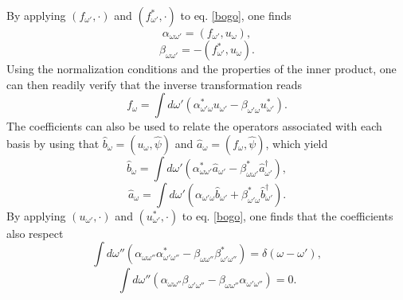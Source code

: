 \documentclass[
12pt,		%
openright,	%
twoside,  %
a4paper,			%
chapter=TITLE,		%
english,			%
french,				%
spanish,			%
brazil				%
]{USPSC-classe/USPSC}
\begin{document}
By applying $(f_{\omega'},\cdot)$ and $(f^*_{\omega'},\cdot)$ to eq. \ref{bogo}, one finds
\begin{equation}\label{coef1}
    \alpha_{\omega\omega'}=(f_{\omega'},u_{\omega}),
\end{equation}
\begin{equation}\label{coef2}
    \beta_{\omega\omega'}=-(f^*_{\omega'},u_{\omega}).
\end{equation}
Using the normalization conditions and the properties of the inner product, one can then readily verify that the inverse transformation reads 
\begin{equation}
    f_{\omega}=\int d\omega'(\alpha_{\omega'\omega}^*u_{\omega'}-\beta_{\omega'\omega}u_{\omega'}^*).
\end{equation}
The coefficients can also be used to relate the operators associated with each basis by using that $\hat{b}_{\omega}=(u_{\omega},\hat{\psi})$ and $\hat{a}_{\omega}=(f_{\omega},\hat{\psi})$, which yield
\begin{equation}\label{bogo1}
    \hat{b}_{\omega}=\int d\omega'(\alpha^*_{\omega\omega'}\hat{a}_{\omega'}-\beta^*_{\omega\omega'}\hat{a}_{\omega'}^{\dag}),
\end{equation}
\begin{equation}\label{bogo2}
    \hat{a}_{\omega}=\int d\omega'(\alpha_{\omega'\omega}\hat{b}_{\omega'}+\beta_{\omega'\omega}^*\hat{b}_{\omega'}^{\dag}).
\end{equation}
By applying $(u_{\omega'},\cdot)$ and $(u^*_{\omega'},\cdot)$ to eq. \ref{bogo}, one finds that the coefficients also respect
\begin{equation}\label{coeff1}
    \int d\omega''(\alpha_{\omega\omega''}\alpha^*_{\omega'\omega''}-\beta_{\omega\omega''}\beta^*_{\omega'\omega''})=\delta({\omega-\omega'}),
\end{equation}
\begin{equation}
     \int d\omega''(\alpha_{\omega\omega''}\beta_{\omega'\omega''}-\beta_{\omega\omega''}\alpha_{\omega'\omega''})=0.
\end{equation}
\end{document}
